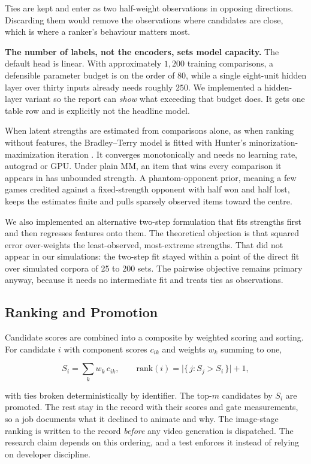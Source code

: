 \documentclass[conference]{IEEEtran}
\begin{document}
Ties are kept and enter as two half-weight observations in opposing directions.
Discarding them would remove the observations where candidates are close, which is
where a ranker's behaviour matters most.

\textbf{The number of labels, not the encoders, sets model capacity.} The default
head is linear. With approximately $1{,}200$ training comparisons, a defensible
parameter budget is on the order of $80$, while a single eight-unit hidden layer
over thirty inputs already needs roughly $250$. We implemented a hidden-layer
variant so the report can \emph{show} what exceeding that budget does. It gets one
table row and is explicitly not the headline model.

When latent strengths are estimated from comparisons alone, as when ranking without
features, the Bradley--Terry model is fitted with Hunter's minorization-maximization
iteration \cite{hunter2004mm}. It converges monotonically and needs no learning
rate, autograd or GPU. Under plain MM, an item that wins every comparison it appears
in has unbounded strength. A phantom-opponent prior, meaning a few games credited
against a fixed-strength opponent with half won and half lost, keeps the estimates
finite and pulls sparsely observed items toward the centre.

We also implemented an alternative two-step formulation that fits strengths first
and then regresses features onto them. The theoretical objection is that squared
error over-weights the least-observed, most-extreme strengths. That did not appear
in our simulations: the two-step fit stayed within a point of the direct fit over
simulated corpora of 25 to 200 sets. The pairwise objective remains primary anyway,
because it needs no intermediate fit and treats ties as observations.

\subsection{Ranking and Promotion}
\label{sec:rank}

Candidate scores are combined into a composite by weighted scoring and sorting.
For candidate $i$ with component scores $c_{ik}$ and weights $w_k$ summing to one,

\begin{equation}
S_i = \sum_{k} w_k\, c_{ik},
\qquad
\text{rank}(i) = \big|\{\, j : S_j > S_i \,\}\big| + 1 ,
\label{eq:weighted}
\end{equation}

with ties broken deterministically by identifier. The top-$m$ candidates by $S_i$
are promoted. The rest stay in the record with their scores and gate measurements,
so a job documents what it declined to animate and why. The image-stage ranking is
written to the record \emph{before} any video generation is dispatched. The research
claim depends on this ordering, and a test enforces it instead of relying on
developer discipline.
\end{document}
